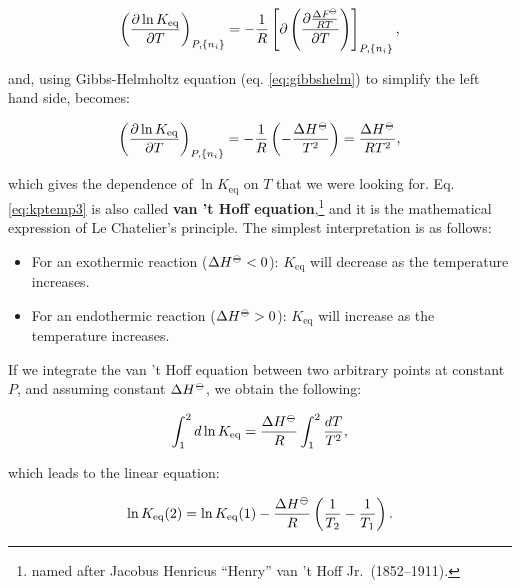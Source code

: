 \documentclass[
  9pt,
]{extbook}
\providecommand{\tightlist}{%
  \setlength{\itemsep}{0pt}\setlength{\parskip}{0pt}}
\theoremstyle{definition}
\theoremstyle{definition}
\theoremstyle{definition}
\theoremstyle{remark}
\begin{document}
\begin{equation}
\left( \frac{\partial \ln K_{\text{eq}}}{\partial T} \right)_{P,\{n_i\}} = -\frac{1}{R} \left[ \partial \left( \frac{\partial \frac{\Delta F^{-\kern-6pt{\ominus}\kern-6pt-}}{RT}}{\partial T} \right) \right]_{P,\{n_i\}},
\label{eq:kptemp2}
\end{equation}

and, using Gibbs-Helmholtz equation (eq. \eqref{eq:gibbshelm}) to simplify the left hand side, becomes:

\begin{equation}
\left( \frac{\partial \ln K_{\text{eq}}}{\partial T} \right)_{P,\{n_i\}} = -\frac{1}{R} \left( -\frac{\Delta H^{-\kern-6pt{\ominus}\kern-6pt-}}{T^2} \right) = \frac{\Delta H^{-\kern-6pt{\ominus}\kern-6pt-}}{RT^2},
\label{eq:kptemp3}
\end{equation}

which gives the dependence of \(\ln K_{\text{eq}}\) on \(T\) that we were looking for. Eq. \eqref{eq:kptemp3} is also called \textbf{van 't Hoff equation},\footnote{named after Jacobus Henricus ``Henry'' van 't Hoff Jr.~(1852--1911).} and it is the mathematical expression of Le Chatelier's principle. The simplest interpretation is as follows:

\begin{itemize}
\tightlist
\item
  For an exothermic reaction (\(\Delta H^{-\kern-6pt{\ominus}\kern-6pt-}< 0\)): \(K_{\text{eq}}\) will decrease as the temperature increases.
\item
  For an endothermic reaction (\(\Delta H^{-\kern-6pt{\ominus}\kern-6pt-}> 0\)): \(K_{\text{eq}}\) will increase as the temperature increases.
\end{itemize}

If we integrate the van 't Hoff equation between two arbitrary points at constant \(P\), and assuming constant \(\Delta H^{-\kern-6pt{\ominus}\kern-6pt-}\), we obtain the following:

\begin{equation}
\int_1^2 d \ln K_{\text{eq}} = \frac{\Delta H^{-\kern-6pt{\ominus}\kern-6pt-}}{R} \int_1^2 \frac{dT}{T^2},
\label{eq:kptemp4}
\end{equation}

which leads to the linear equation:

\begin{equation}
\ln K_{\text{eq}}(2) = \ln K_{\text{eq}}(1) - \frac{\Delta H^{-\kern-6pt{\ominus}\kern-6pt-}}{R} \left( \frac{1}{T_2}-\frac{1}{T_1} \right).
\label{eq:vthoffeqI}
\end{equation}
\end{document}
